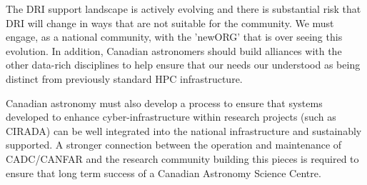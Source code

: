 \documentclass[11pt]{article}
\begin{document}
\begin{lrptextbox} 
The DRI support landscape is actively evolving and there is substantial risk that DRI will change in ways that are not suitable for the community.  We must engage, as a national community, with the 'newORG' that is over seeing this evolution.  In addition, Canadian astronomers should build alliances with the other data-rich disciplines to help ensure that our needs our understood as being distinct from previously standard HPC infrastructure.  

Canadian astronomy must also develop a process to ensure that systems developed to enhance cyber-infrastructure within research projects (such as CIRADA) can be well integrated into the national infrastructure and sustainably supported.  A stronger connection between the operation and maintenance of CADC/CANFAR and the research community building this pieces is required to ensure that long term success of a Canadian Astronomy Science Centre.

\end{lrptextbox}

\begin{lrptextbox} 

\end{lrptextbox}

 
\end{document}
